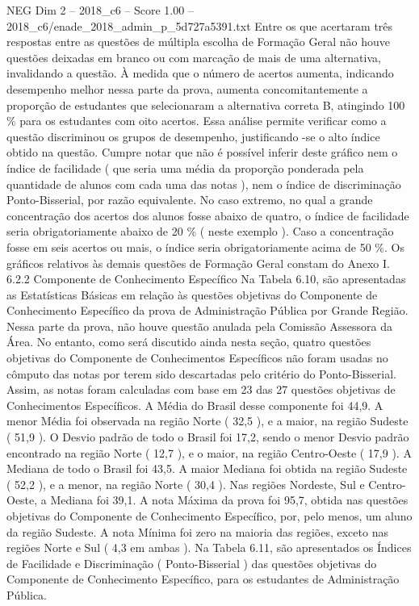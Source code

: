\begin{textsample}{NEG Dim 2 – 2018\_c6 – Score 1.00 – 2018\_c6/enade\_2018\_admin\_p\_5d727a5391.txt}
Entre os que acertaram três respostas entre as questões de múltipla escolha de Formação Geral não houve questões deixadas em branco ou com marcação de mais de uma alternativa, invalidando a questão.
À medida que o número de acertos aumenta, indicando desempenho melhor nessa parte da prova, aumenta concomitantemente a proporção de estudantes que selecionaram a alternativa correta B, atingindo 100 \% para os estudantes com oito acertos.
Essa análise permite verificar como a questão discriminou os grupos de desempenho, justificando -se o alto índice obtido na questão.
Cumpre notar que não é possível inferir deste gráfico nem o índice de facilidade ( que seria uma média da proporção ponderada pela quantidade de alunos com cada uma das notas ), nem o índice de discriminação Ponto-Bisserial, por razão equivalente.
No caso extremo, no qual a grande concentração dos acertos dos alunos fosse abaixo de quatro, o índice de facilidade seria obrigatoriamente abaixo de 20 \% ( neste exemplo ).
Caso a concentração fosse em seis acertos ou mais, o índice seria obrigatoriamente acima de 50 \%.
Os gráficos relativos às demais questões de Formação Geral constam do Anexo I. 6.2.2 Componente de Conhecimento Específico Na Tabela 6.10, são apresentadas as Estatísticas Básicas em relação às questões objetivas do Componente de Conhecimento Específico da prova de Administração Pública por Grande Região.
Nessa parte da prova, não houve questão anulada pela Comissão Assessora da Área.
No entanto, como será discutido ainda nesta seção, quatro questões objetivas do Componente de Conhecimentos Específicos não foram usadas no cômputo das notas por terem sido descartadas pelo critério do Ponto-Bisserial.
Assim, as notas foram calculadas com base em 23 das 27 questões objetivas de Conhecimentos Específicos.
A Média do Brasil desse componente foi 44,9.
A menor Média foi observada na região Norte ( 32,5 ), e a maior, na região Sudeste ( 51,9 ).
O Desvio padrão de todo o Brasil foi 17,2, sendo o menor Desvio padrão encontrado na região Norte ( 12,7 ), e o maior, na região Centro-Oeste ( 17,9 ).
A Mediana de todo o Brasil foi 43,5.
A maior Mediana foi obtida na região Sudeste ( 52,2 ), e a menor, na região Norte ( 30,4 ).
Nas regiões Nordeste, Sul e Centro-Oeste, a Mediana foi 39,1.
A nota Máxima da prova foi 95,7, obtida nas questões objetivas do Componente de Conhecimento Específico, por, pelo menos, um aluno da região Sudeste.
A nota Mínima foi zero na maioria das regiões, exceto nas regiões Norte e Sul ( 4,3 em ambas ).
Na Tabela 6.11, são apresentados os Índices de Facilidade e Discriminação ( Ponto-Bisserial ) das questões objetivas do Componente de Conhecimento Específico, para os estudantes de Administração Pública.

\end{textsample}
